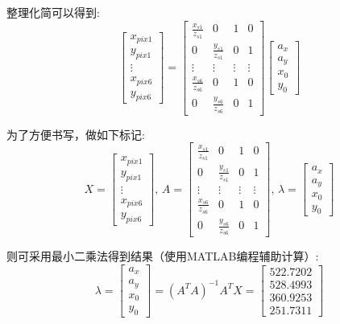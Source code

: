 \documentclass[]{article}
\begin{document}
\begin{enumerate}
整理化简可以得到:
$$
\begin{bmatrix}x_{pix1} \\ y_{pix1} \\ \vdots \\ x_{pix6} \\ y_{pix6} \end{bmatrix}=\begin{bmatrix}\frac{x_{s1}}{z_{s1}} & 0 & 1 & 0 \\ 0 & \frac{y_{s1}}{z_{s1}} & 0 & 1 \\ \vdots & \vdots & \vdots & \vdots \\ \frac{x_{s6}}{z_{s6}} & 0 & 1 & 0 \\ 0 & \frac{y_{s6}}{z_{s6}} & 0 & 1\end{bmatrix}\begin{bmatrix}a_x \\ a_y \\ x_0 \\ y_0\end{bmatrix}
$$

为了方便书写，做如下标记:
$$
X = \begin{bmatrix}x_{pix1} \\ y_{pix1} \\ \vdots \\ x_{pix6} \\ y_{pix6} \end{bmatrix},\,A=\begin{bmatrix}\frac{x_{s1}}{z_{s1}} & 0 & 1 & 0 \\ 0 & \frac{y_{s1}}{z_{s1}} & 0 & 1 \\ \vdots & \vdots & \vdots & \vdots \\ \frac{x_{s6}}{z_{s6}} & 0 & 1 & 0 \\ 0 & \frac{y_{s6}}{z_{s6}} & 0 & 1\end{bmatrix},\,\lambda=\begin{bmatrix}a_x \\ a_y \\ x_0 \\ y_0\end{bmatrix}
$$

则可采用最小二乘法得到结果（使用MATLAB编程辅助计算）:
$$
\lambda=\begin{bmatrix}a_x \\ a_y \\ x_0 \\ y_0\end{bmatrix}=(A^TA)^{-1}A^TX=\begin{bmatrix}522.7202\\ 528.4993 \\ 360.9253 \\ 251.7311\end{bmatrix}
$$


\end{enumerate}
\end{document}
